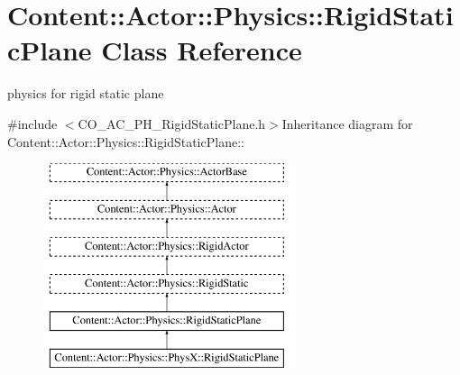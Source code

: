 \hypertarget{classContent_1_1Actor_1_1Physics_1_1RigidStaticPlane}{
\section{Content::Actor::Physics::RigidStaticPlane Class Reference}
\label{classContent_1_1Actor_1_1Physics_1_1RigidStaticPlane}
}


physics for rigid static plane  


{\ttfamily \#include $<$CO\_\-AC\_\-PH\_\-RigidStaticPlane.h$>$}Inheritance diagram for Content::Actor::Physics::RigidStaticPlane::\begin{figure}[H]
\begin{center}
\leavevmode
\includegraphics[height=6cm]{classContent_1_1Actor_1_1Physics_1_1RigidStaticPlane}
\end{center}
\end{figure}
